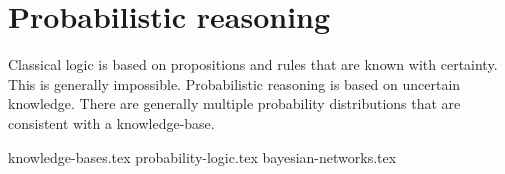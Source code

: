 \section{Probabilistic reasoning}

Classical logic is based on propositions and rules that are known with
certainty.
This is generally impossible.
Probabilistic reasoning is based on uncertain knowledge.
There are generally multiple probability distributions that are consistent with
a knowledge-base.

{knowledge-bases.tex}
{probability-logic.tex}
{bayesian-networks.tex}